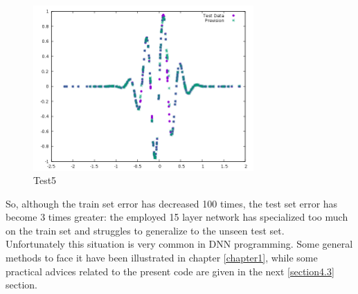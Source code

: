 \documentclass[12pt, a4paper]{report}
\theoremstyle{definition}
\begin{document}
\begin{figure}[H]
	\centering
	\includegraphics[width=0.75\textwidth]{img/Test5} 
	\caption{Test5}
\end{figure}
\noindent So, although the train set error has decreased 100 times, the test set error has become 3 times greater: the employed 15 layer network has specialized too much on the train set and struggles to generalize to the unseen test set.\\
Unfortunately this situation is very common in DNN programming. Some general methods to face it have been illustrated in chapter \ref{chapter1}, while some practical advices related to the present code are given in the next \ref{section4.3} section. 
\end{document}

